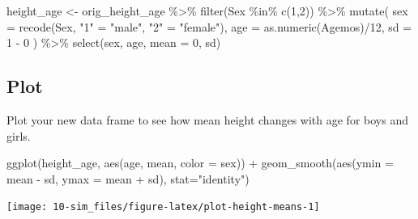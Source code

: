 \documentclass[
  oneside]{book}
\newenvironment{Shaded}{\begin{snugshade}}{\end{snugshade}}
\newcommand{\AttributeTok}[1]{\textcolor[rgb]{0.77,0.63,0.00}{#1}}
\newcommand{\DecValTok}[1]{\textcolor[rgb]{0.00,0.00,0.81}{#1}}
\newcommand{\FunctionTok}[1]{\textcolor[rgb]{0.00,0.00,0.00}{#1}}
\newcommand{\NormalTok}[1]{#1}
\newcommand{\OtherTok}[1]{\textcolor[rgb]{0.56,0.35,0.01}{#1}}
\newcommand{\SpecialCharTok}[1]{\textcolor[rgb]{0.00,0.00,0.00}{#1}}
\newcommand{\StringTok}[1]{\textcolor[rgb]{0.31,0.60,0.02}{#1}}
\begin{document}
\begin{Shaded}
\begin{Highlighting}[]
\NormalTok{height\_age }\OtherTok{\textless{}{-}}\NormalTok{ orig\_height\_age }\SpecialCharTok{\%\textgreater{}\%}
  \FunctionTok{filter}\NormalTok{(Sex }\SpecialCharTok{\%in\%} \FunctionTok{c}\NormalTok{(}\DecValTok{1}\NormalTok{,}\DecValTok{2}\NormalTok{)) }\SpecialCharTok{\%\textgreater{}\%}
  \FunctionTok{mutate}\NormalTok{(}
    \AttributeTok{sex =} \FunctionTok{recode}\NormalTok{(Sex, }\StringTok{"1"} \OtherTok{=} \StringTok{"male"}\NormalTok{, }\StringTok{"2"} \OtherTok{=} \StringTok{"female"}\NormalTok{),}
    \AttributeTok{age =} \FunctionTok{as.numeric}\NormalTok{(Agemos)}\SpecialCharTok{/}\DecValTok{12}\NormalTok{,}
    \AttributeTok{sd =} \StringTok{\textasciigrave{}}\AttributeTok{1}\StringTok{\textasciigrave{}} \SpecialCharTok{{-}} \StringTok{\textasciigrave{}}\AttributeTok{0}\StringTok{\textasciigrave{}}
\NormalTok{  ) }\SpecialCharTok{\%\textgreater{}\%}
  \FunctionTok{select}\NormalTok{(sex, age, }\AttributeTok{mean =} \StringTok{\textasciigrave{}}\AttributeTok{0}\StringTok{\textasciigrave{}}\NormalTok{, sd)}
\end{Highlighting}
\end{Shaded}

\hypertarget{plot}{%
\subsection{Plot}\label{plot}}

Plot your new data frame to see how mean height changes with age for boys and girls.

\begin{Shaded}
\begin{Highlighting}[]
\FunctionTok{ggplot}\NormalTok{(height\_age, }\FunctionTok{aes}\NormalTok{(age, mean, }\AttributeTok{color =}\NormalTok{ sex)) }\SpecialCharTok{+}
  \FunctionTok{geom\_smooth}\NormalTok{(}\FunctionTok{aes}\NormalTok{(}\AttributeTok{ymin =}\NormalTok{ mean }\SpecialCharTok{{-}}\NormalTok{ sd, }
                  \AttributeTok{ymax =}\NormalTok{ mean }\SpecialCharTok{+}\NormalTok{ sd),}
              \AttributeTok{stat=}\StringTok{"identity"}\NormalTok{)}
\end{Highlighting}
\end{Shaded}

\begin{center}\texttt{[image: 10-sim\_files/figure-latex/plot-height-means-1]} \end{center}
\end{document}
